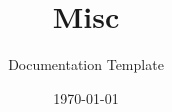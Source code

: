 \documentclass[Misc]{../../data/TelemacDoc} %
\begin{document}
\let\cleardoublepage\clearpage

\title{Misc}
\subtitle{Documentation Template}
\version{\telmaversion}
\date{\today}
\maketitle
\clearpage



\newpage

\thispagestyle{empty}

\TelemacCopyright{}




\pagestyle{empty} %

\tableofcontents%


\pagestyle{fancy} %












\end{document}
